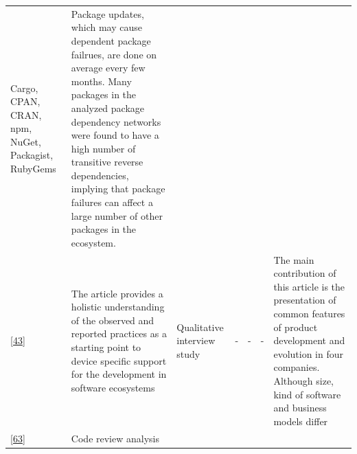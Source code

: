 \documentclass[]{book}
\begin{document}
\begin{longtable}[]{@{}lllllll@{}}
\begin{minipage}[t]{0.12\columnwidth}
Cargo, CPAN, CRAN, npm, NuGet, Packagist, RubyGems\strut
\end{minipage} & \begin{minipage}[t]{0.10\columnwidth}\raggedright\strut
Package updates, which may cause dependent package failrues, are done on
average every few months. Many packages in the analyzed package
dependency networks were found to have a high number of transitive
reverse dependencies, implying that package failures can affect a large
number of other packages in the ecosystem.\strut
\end{minipage}\tabularnewline
\begin{minipage}[t]{0.09\columnwidth}\raggedright\strut
{[}\protect\hyperlink{ref-Dittrich2014}{43}{]}\strut
\end{minipage} & \begin{minipage}[t]{0.16\columnwidth}\raggedright\strut
The article provides a holistic understanding of the observed and
reported practices as a starting point to device specific support for
the development in software ecosystems\strut
\end{minipage} & \begin{minipage}[t]{0.17\columnwidth}\raggedright\strut
Qualitative interview study\strut
\end{minipage} & \begin{minipage}[t]{0.07\columnwidth}\raggedright\strut
-\strut
\end{minipage} & \begin{minipage}[t]{0.10\columnwidth}\raggedright\strut
-\strut
\end{minipage} & \begin{minipage}[t]{0.12\columnwidth}\raggedright\strut
-\strut
\end{minipage} & \begin{minipage}[t]{0.10\columnwidth}\raggedright\strut
The main contribution of this article is the presentation of common
features of product development and evolution in four companies.
Although size, kind of software and business models differ\strut
\end{minipage}\tabularnewline
\begin{minipage}[t]{0.09\columnwidth}\raggedright\strut
{[}\protect\hyperlink{ref-Izquierdo2018}{63}{]}\strut
\end{minipage} & \begin{minipage}[t]{0.16\columnwidth}\raggedright\strut
Code review analysis\strut
\end{minipage} & \begin{minipage}[t]{0.17\columnwidth}\raggedright\strut

\end{minipage}
\end{longtable}
\end{document}
